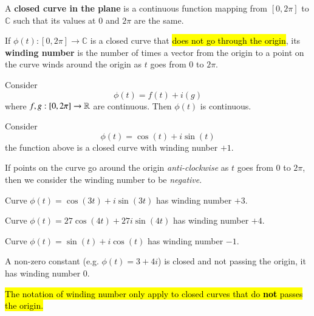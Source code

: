 \documentclass[11pt]{article}
\begin{document}
		\begin{definition}
			A \textbf{closed curve in the plane} is a continuous function mapping from $[0, 2\pi]$ to $\mathbb{C}$ such that its values at $0$ and $2\pi$ are the same.
		\end{definition}

		\begin{definition}
			If $\phi(t): [0, 2\pi] \to \mathbb{C}$ is a closed curve that \hl{does not go through the origin}, its \textbf{winding number} is the number of times a vector from the origin to a point on the curve winds around the origin as $t$ goes from $0$ to $2\pi$.
		\end{definition}

		\begin{example}
			Consider 
			\[
				\phi(t) = f(t) + i(g)
			\]
			where $f,g: [0, 2\pi] \to \mathbb{R}$ are continuous. Then $\phi(t)$ is continuous.
		\end{example}

		\begin{example}
			Consider 
			\[
				\phi(t) = \cos(t) + i\sin(t)
			\]
			the function above is a closed curve with winding nunber $+1$.
		\end{example}

		\begin{remark}
			If points on the curve go around the origin \emph{anti-clockwise} as $t$ goes from $0$ to $2\pi$, then we consider the winding number to be \emph{negative}.
		\end{remark}

		\begin{example}
			Curve $\phi(t) = \cos(3t) + i \sin(3t)$ has winding number $+3$.
		\end{example}

		\begin{example}
			Curve $\phi(t) = 27\cos(4t) + 27 i \sin(4t)$ has winding number $+4$.
		\end{example}
		
		\begin{example}
			Curve $\phi(t) = \sin(t) + i \cos(t)$ has winding number $-1$.
		\end{example}
		
		\begin{example}
			A non-zero constant (e.g. $\phi(t)=3+4i$) is closed and not passing the origin, it has winding number $0$.
		\end{example}
		
		\begin{remark}
			\hl{The notation of winding number only apply to closed curves that do \textbf{not} passes the origin.}
		\end{remark}
\end{document}
